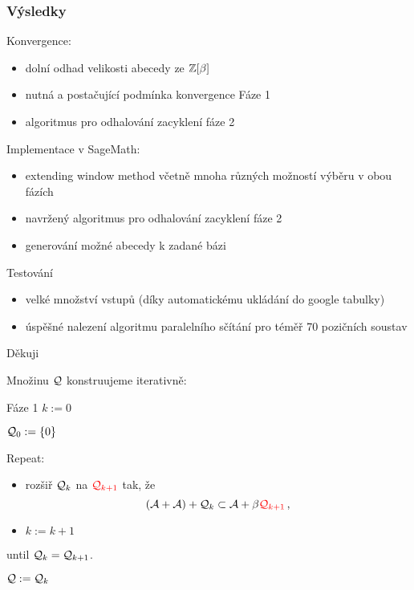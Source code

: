 \documentclass[11pt]{beamer}
\begin{document}
\begin{frame}
    \frametitle{Výsledky}    
	Konvergence:
    \begin{itemize}
        \item dolní odhad velikosti abecedy ze $\mathbb{Z}[\beta]$
        \item nutná a postačující podmínka konvergence Fáze 1
        \item algoritmus pro odhalování zacyklení fáze 2
    \end{itemize}
    \pause
    Implementace v SageMath:
    \begin{itemize}
        \item extending window method včetně mnoha různých možností výběru v obou fázích
        \item navržený algoritmus pro odhalování zacyklení fáze 2
        \item generování možné abecedy k zadané bázi
    \end{itemize}    
    \pause
    Testování
    \begin{itemize}
	    \item velké množství vstupů (díky automatickému ukládání do google tabulky)
	    \item úspěšné nalezení algoritmu paralelního sčítání pro téměř 70 pozičních soustav
    \end{itemize}
\end{frame}


\begin{frame}
\fontsize{14pt}{10}\selectfont
\begin{center}
Děkuji

\end{center}    

\end{frame}


\begin{frame}
    Množinu $\mathcal{Q}$ konstruujeme iterativně:
    \begin{block}{Fáze 1}
     $k:=0$
     
    $\mathcal{Q}_0:=\{0\}$
      
      \pause
      Repeat:
      \begin{itemize}
          \item rozšiř $\mathcal{Q}_k$ na $\textcolor{red}{\mathcal{Q}_{k+1}}$ tak, že
           $$
              (\mathcal{A}+\mathcal{A})+ \mathcal{Q}_k \subset \mathcal{A} + \beta \textcolor{red}{\mathcal{Q}_{k+1}}\,,
           $$
           \item $k:=k+1$
      \end{itemize}
      \pause
      until $\mathcal{Q}_k = \mathcal{Q}_{k+1}$.
      
      \pause
      \vspace{7pt}
      $\mathcal{Q}:=\mathcal{Q}_k$
    \end{block}
\end{frame}
\end{document}
